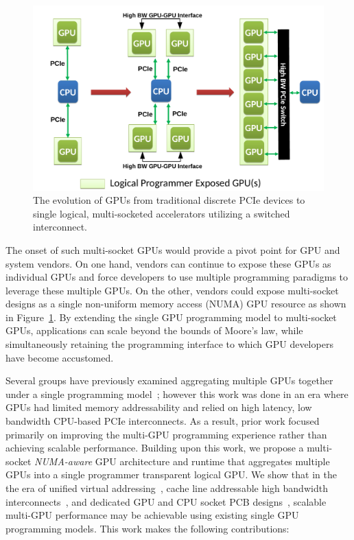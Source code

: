 \begin{figure}[t]
	\centering
	\includegraphics[width=1.0\columnwidth]{figures/inter_gpu_connections.pdf}
	\caption{The evolution of GPUs from traditional discrete PCIe devices to 
		single logical, multi-socketed accelerators utilizing a switched interconnect.}
	\vspace{-0.5cm}
	\label{fig:systemdiagram}
\end{figure}

The onset of such multi-socket GPUs would provide a pivot point for GPU and system 
vendors. On one hand, vendors can continue to expose these GPUs as 
individual GPUs and force developers to use multiple
programming paradigms to 
leverage these multiple GPUs. On the other, vendors could expose multi-socket 
designs as a single non-uniform memory access (NUMA) GPU resource as shown in Figure~\ref{fig:systemdiagram}.  
By extending the single GPU programming model to multi-socket GPUs,  applications 
can scale beyond the bounds of Moore's law, while simultaneously retaining the 
programming interface to which GPU developers have become accustomed.

Several groups have previously examined aggregating multiple GPUs together under 
a single programming model~\cite{lee2013transparent,Cabezas2015}; however this 
work was done in an era where GPUs had limited memory addressability and relied 
on high latency, low bandwidth CPU-based PCIe interconnects. As a result, prior work 
focused primarily on improving the multi-GPU programming experience rather than 
achieving scalable performance. Building upon this work, we propose a 
multi-socket \textit{NUMA-aware} GPU architecture and runtime that aggregates 
multiple GPUs into a single programmer transparent logical GPU. We show that in 
the the era of unified virtual addressing~\cite{UVM}, cache line addressable 
high bandwidth interconnects~\cite{NVLINK}, and dedicated GPU and CPU socket PCB 
designs~\cite{SierraHPC}, scalable multi-GPU performance may be achievable using 
existing single GPU programming models. This work makes the following 
contributions:

